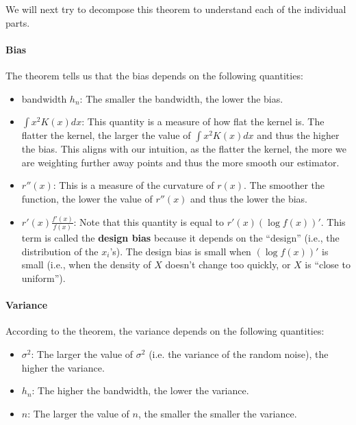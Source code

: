 We will next try to decompose this theorem to understand each of the individual parts. 

\paragraph{Bias} The theorem tells us that the bias depends on the following quantities: 
\begin{itemize}
	\item bandwidth $h_n$: The smaller the bandwidth, the lower the bias. 
	\item $\int x^2 K(x) dx$: This quantity is a measure of how flat the kernel is. The flatter the kernel, the larger the value of $\int x^2K(x) dx$ and thus the higher the bias. This aligns with our intuition, as the flatter the kernel, the more we are weighting further away points and thus the more smooth our estimator. 
	\item $r''(x)$: This is a measure of the curvature of $r(x)$. The smoother the function, the lower the value of $r''(x)$ and thus the lower the bias. 
	\item $r'(x)\frac{f'(x)}{f(x)}$: Note that this quantity is equal to $r'(x)(\log f(x))'$. This term is called the \textbf{design bias} because it depends on the ``design'' (i.e., the distribution of the $x_i$'s). The design bias is small when $(\log f(x))'$ is small (i.e., when the density of $X$ doesn't change too quickly, or $X$ is ``close to uniform''). 
\end{itemize}

\paragraph{Variance} According to the theorem, the variance depends on the following quantities:
\begin{itemize}
	\item $\sigma^2$: The larger the value of $\sigma^2$ (i.e. the variance of the random noise), the higher the variance. 
	\item $h_n$: The higher the bandwidth, the lower the variance.
	\item $n$: The larger the value of $n$, the smaller the smaller the variance.
\end{itemize}

